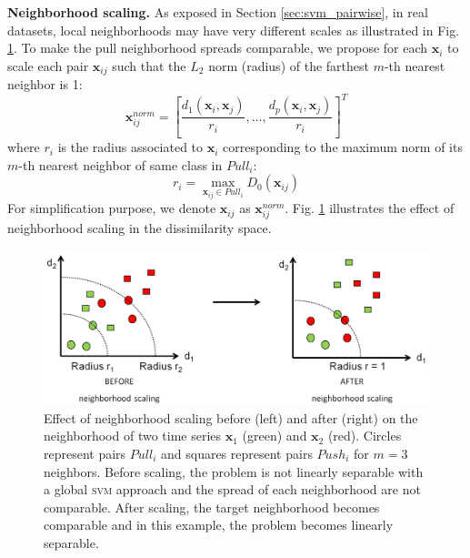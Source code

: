 \noindent \textbf{Neighborhood scaling.} 
As exposed in Section \ref{sec:svm_pairwise}, in real datasets, local neighborhoods may have very different scales as illustrated in Fig. \ref{fig:Neighborhood_scaling2}. To make the pull neighborhood spreads comparable, we propose for each $\textbf{x}_i$ to scale each pair $\textbf{x}_{ij}$ such that the $L_2$ norm (radius) of the farthest $m$-th nearest neighbor is 1:
\begin{equation}
\textbf{x}_{ij}^{norm} = \left[ \frac{d_1(\textbf{x}_{i},\textbf{x}_{j})}{r_i}, \ldots, \frac{d_p(\textbf{x}_{i},\textbf{x}_{j})}{r_i}\right] ^T \label{eq:normalization_radius}
\end{equation}
where $r_i$ is the radius associated to $\textbf{x}_i$ corresponding to the maximum norm of its $m$-th nearest neighbor of same class in $Pull_i$:
\begin{equation}
r_i = \max_{\textbf{x}_{ij} \in Pull_i} D_0(\textbf{x}_{ij})
\end{equation}
For simplification purpose, we denote $\textbf{x}_{ij}$ as $\textbf{x}_{ij}^{norm}$. Fig. \ref{fig:Neighborhood_scaling2} illustrates the effect of neighborhood scaling in the dissimilarity space.
\begin{figure}[h!]
	\centering
	\includegraphics[width=0.8\linewidth]{images/Neighborhood_scaling}
	\caption[Effect of neighborhood scaling before (left) and after (right) on the neighborhood of two time series $\textbf{x}_1$ (green) and $\textbf{x}_2$ (red).]{Effect of neighborhood scaling before (left) and after (right) on the neighborhood of two time series $\textbf{x}_1$ (green) and $\textbf{x}_2$ (red). Circles represent pairs $Pull_i$ and squares represent pairs $Push_i$ for $m=3$ neighbors. Before scaling, the problem is not linearly separable with a global \textsc{svm} approach and the spread of each neighborhood are not comparable. After scaling, the target neighborhood becomes comparable and in this example, the problem becomes linearly separable.}
	\label{fig:Neighborhood_scaling2}
\end{figure}



